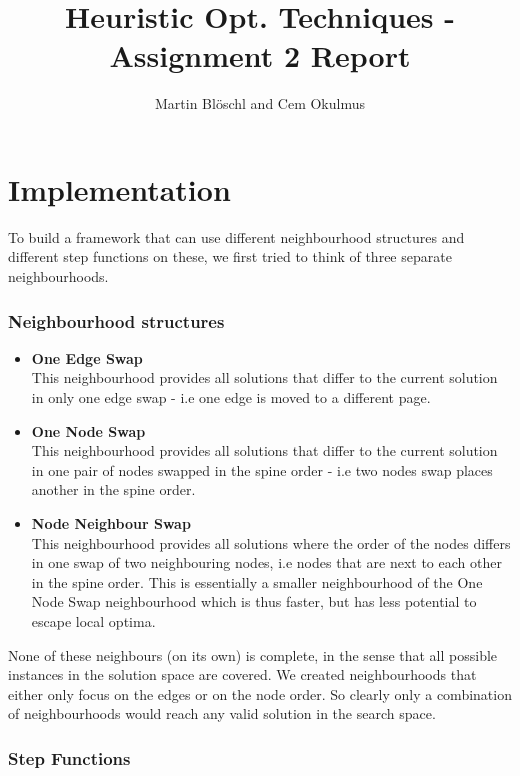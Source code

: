 \documentclass [11pt]{article}
\begin{document}
\title{ Heuristic Opt. Techniques - Assignment 2 Report}
\author{ Martin Blöschl and Cem Okulmus }

\maketitle
\thispagestyle{empty}


\section{Implementation}
To build a framework that can use different neighbourhood structures and different step functions on these, we first tried to think of three separate neighbourhoods. 

\subsubsection{Neighbourhood structures}

\begin{itemize}
  \item \textbf{One Edge Swap} \\
  This neighbourhood provides all solutions that differ to the current solution in only one edge swap - i.e one edge is moved to a different page.
  \item \textbf{One Node Swap} \\ 
  This neighbourhood provides all solutions that differ to the current solution in one pair of nodes swapped in the spine order - i.e two nodes swap places another in the spine order.
  \item \textbf{Node Neighbour Swap} \\
  This neighbourhood provides all solutions where the order of the nodes differs in one swap of two neighbouring nodes, i.e nodes that are next to each other in the spine order.  
  This is essentially a smaller neighbourhood of the One Node Swap neighbourhood which is thus faster, but has less potential to escape local optima.
\end{itemize}

None of these neighbours (on its own) is complete, in the sense that all possible instances in the solution space are covered.  We created neighbourhoods that either only focus on the edges or on the node order. So clearly only a combination of neighbourhoods would reach any valid solution in the search space.


\subsubsection{Step Functions}
\end{document}
